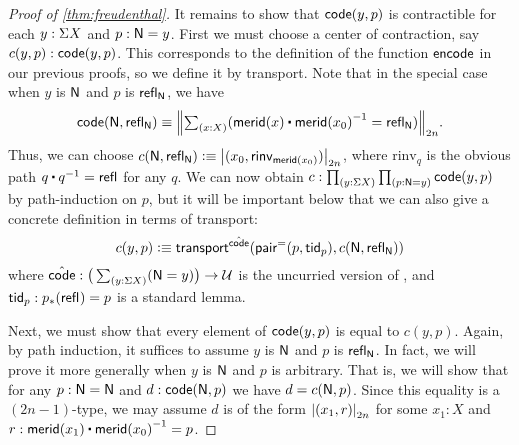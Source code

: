 \begin{proof}[Proof of \autoref{thm:freudenthal}]
  It remains to show that $\code(y,p)$ is contractible for each $y:\susp X$ and $p:\north=y$.
  First we must choose a center of contraction, say $c(y,p):\code(y,p)$.
  This corresponds to the definition of the function $\encode$ in our previous proofs, so we define it by transport.
  Note that in the special case when $y$ is $\north$ and $p$ is $\refl{\north}$, we have
  \[\code(\north,\refl{\north}) \jdeq \trunc{2n}{\tsm{x:X} (\merid(x) \ct \opp{\merid(x_0)} = \refl{\north})}.\]
  Thus, we can choose $c(\north,\refl{\north})\defeq \tproj{2n}{(x_0,\mathsf{rinv}_{\merid(x_0)})}$, where $\mathrm{rinv}_q$ is the obvious path $q\ct\opp q = \refl{}$ for any $q$.
  We can now obtain $c:\prd{y:\susp X}{p:\north=y} \code(y,p)$ by path-induction on $p$, but it will be important below that we can also give a concrete definition in terms of transport:
  \[ c(y,p) \defeq \transfib{\hat{\code}}{\pairpath(p,\mathsf{tid}_p)}{c(\north,\refl{\north})}
  \]
  where $\hat{\code}: \big(\sm{y:\susp X} (\north=y)\big) \to \type$ is the uncurried version of \code, and $\mathsf{tid}_p:\trans{p}{\refl{}} = p$ is a standard lemma.

  Next, we must show that every element of $\code(y,p)$ is equal to $c(y,p)$.
  Again, by path induction, it suffices to assume $y$ is $\north$ and $p$ is $\refl{\north}$.
  In fact, we will prove it more generally when $y$ is $\north$ and $p$ is arbitrary.
  That is, we will show that for any $p:\north=\north$ and $d:\code(\north,p)$ we have $d = c(\north,p)$.
  Since this equality is a $(2n-1)$-type, we may assume $d$ is of the form $\tproj{2n}{(x_1,r)}$ for some $x_1:X$ and $r:\merid(x_1) \ct \opp{\merid(x_0)} = p$.


\end{proof}
